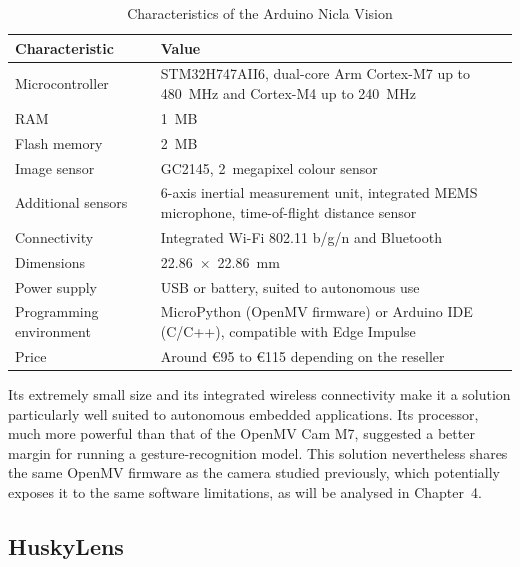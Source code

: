 \documentclass[12pt,a4paper]{report}
\begin{document}
	\begin{table}[H]
		\centering
		\small
		\renewcommand{\arraystretch}{1.15}
		\begin{tabularx}{\textwidth}{|l|X|}
			\hline
			\textbf{Characteristic} & \textbf{Value} \\
			\hline
			Microcontroller & STM32H747AII6, dual-core Arm Cortex-M7 up to 480~MHz and Cortex-M4 up to 240~MHz \\
			\hline
			RAM & 1~MB \\
			\hline
			Flash memory & 2~MB \\
			\hline
			Image sensor & GC2145, 2~megapixel colour sensor \\
			\hline
			Additional sensors & 6-axis inertial measurement unit, integrated MEMS microphone, time-of-flight distance sensor \\
			\hline
			Connectivity & Integrated Wi-Fi 802.11 b/g/n and Bluetooth \\
			\hline
			Dimensions & 22.86~$\times$~22.86~mm \\
			\hline
			Power supply & USB or battery, suited to autonomous use \\
			\hline
			Programming environment & MicroPython (OpenMV firmware) or Arduino IDE (C/C++), compatible with Edge Impulse \\
			\hline
			Price & Around €95 to €115 depending on the reseller \\
			\hline
		\end{tabularx}
		\caption{Characteristics of the Arduino Nicla Vision}
		\label{tab:nicla-specs}
	\end{table}
	
	Its extremely small size and its integrated wireless connectivity make it a solution particularly well suited to autonomous embedded applications. Its processor, much more powerful than that of the OpenMV Cam M7, suggested a better margin for running a gesture-recognition model. This solution nevertheless shares the same OpenMV firmware as the camera studied previously, which potentially exposes it to the same software limitations, as will be analysed in Chapter~4.
	
	
	\subsection{HuskyLens}
	
\end{document}
